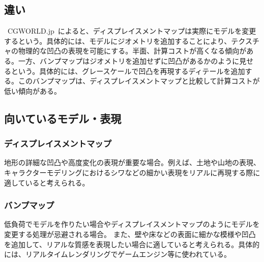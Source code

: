 \documentclass[a4j]{jarticle}
\begin{document}
\subsection{違い}
%
\ CGWORLD.jp\ によると、ディスプレイスメントマップは実際にモデルを変更するという\cite{cgworld}。具体的には、モデルにジオメトリを追加することにより、テクスチャの物理的な凹凸の表現を可能にする。半面、計算コストが高くなる傾向がある。一方、バンプマップはジオメトリを追加せずに凹凸があるかのように見せるという\cite{cgworld}。具体的には、グレースケールで凹凸を再現するディテールを追加する。このバンプマップは、ディスプレイスメントマップと比較して計算コストが低い傾向がある。
%
\subsection{向いているモデル・表現}
%
\subsubsection{ディスプレイスメントマップ}
%
地形の詳細な凹凸や高度変化の表現が重要な場合。例えば、土地や山地の表現、キャラクターモデリングにおけるシワなどの細かい表現をリアルに再現する際に適していると考えられる。
%
\subsubsection{バンプマップ}
%
低負荷でモデルを作りたい場合やディスプレイスメントマップのようにモデルを変更する処理が忌避される場合。 また、壁や床などの表面に細かな模様や凹凸を追加して、リアルな質感を表現したい場合に適していると考えられる。具体的には、リアルタイムレンダリングでゲームエンジン等に使われている。
%
\end{document}
